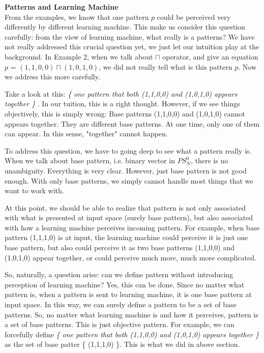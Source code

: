 {\bf Patterns and Learning Machine} \\
From the examples, we know that one pattern $p$ could be perceived very differently by different learning machine. This make us consider this question carefully: from the view of learning machine, what really is a patterns? We have not really addressed this crucial question yet, we just let our intuition play at the background. In Example 2, when we talk about $\sqcap$ operator, and give an equation $p$ = $(1,1,0,0) \sqcap (1,0,1,0)$, we did not really tell what is this pattern $p$. Now we address this more carefully.

Take a look at this: {\it \{ one pattern that both (1,1,0,0) and (1,0,1,0) appears together \} }. In our tuition, this is a right thought. However, if we see things objectively, this is simply wrong: Base patterns (1,1,0,0) and (1,0,1,0) cannot appears together. They are different base patterns. At one time, only one of them can appear. In this sense, "together" cannot happen.

To address this question, we have to going deep to see what a pattern really is. When we talk about base pattern, i.e. binary vector in $PS^0_N$, there is no unambiguity. Everything is very clear. However, just base pattern is not good enough. With only base patterns, we simply cannot handle most things that we want to work with. 

At this point, we should be able to realize that pattern is not only associated with what is presented at input space (surely base pattern), but also associated with how a learning machine perceives incoming pattern. For example, when base pattern (1,1,1,0) is at input, the learning machine could perceive it is just one base pattern, but also could perceive it as two base patterns (1,1,0,0) and (1,0,1,0) appear together, or could perceive much more, much more complicated. 

So, naturally, a question arise: can we define pattern without introducing perception of learning machine? Yes, this can be done. Since no matter what pattern is, when a pattern is sent to learning machine, it is one base pattern at input space. In this way, we can surely define a pattern to be a set of base patterns. So, no matter what learning machine is and how it perceives, pattern is a set of base patterns. This is just objective pattern. For example, we can forcefully define  {\it \{ one pattern that both (1,1,0,0) and (1,0,1,0) appears together \} } as the set of base patter  \{ (1,1,1,0) \}. This is what we did in above section. 

